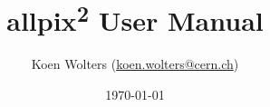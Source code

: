 \documentclass{scrartcl}
\title{allpix\textsuperscript{2} User Manual} %
\author{
    Koen Wolters (\href{mailto:koen.wolters@cern.ch}{koen.wolters@cern.ch})
} %
\date{\today} %
\begin{document}
\maketitle %


\begin{abstract}
\end{abstract}

\newpage
\tableofcontents

\newpage



\clearpage
{}
{}
\begin{thebibliography}{99}
  
\end{thebibliography}  
\end{document}

